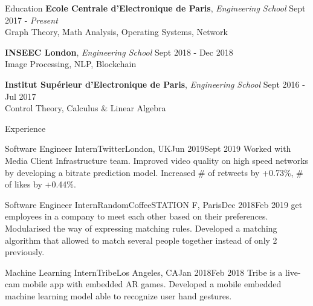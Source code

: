 \documentclass{resume} %
\begin{document}
	\begin{rSection}{Education}
		{\bf Ecole Centrale d'Electronique de Paris}, {\em Engineering School} \hfill {Sept 2017 - \em Present}
		\\ Graph Theory, Math Analysis, Operating Systems, Network

		{\bf INSEEC London}, {\em Engineering School} \hfill {Sept 2018 - Dec 2018}
		\\ Image Processing, NLP, Blockchain

		{\bf Institut Supérieur d'Electronique de Paris}, {\em Engineering School} \hfill {Sept 2016 - Jul 2017}
		\\ Control Theory, Calculus \& Linear Algebra
	\end{rSection}

	\begin{rSection}{Experience}
		\begin{job}{Software Engineer Intern}{Twitter}{London, UK}{Jun 2019}{Sept 2019}{
			Worked with Media Client Infrastructure team. Improved video quality on high speed networks by developing a bitrate prediction model. Increased \# of retweets by +0.73\%, \# of likes by +0.44\%.
		}
		\end{job}


		\begin{job}{Software Engineer Intern}{RandomCoffee}{STATION F, Paris}{Dec 2018}{Feb 2019}{
			 get employees in a company to meet each other based on their preferences. Modularised the way of expressing matching rules. Developed a matching algorithm that allowed to match several people together instead of only 2 previously.
		}
		\end{job}

		\begin{job}{Machine Learning Intern}{Tribe}{Los Angeles, CA}{Jan 2018}{Feb 2018}{
			Tribe is a live-cam mobile app with embedded AR games. Developed a mobile embedded machine learning model able to recognize user hand gestures.
		}
		\end{job}
	\end{rSection}
\end{document}
